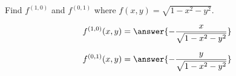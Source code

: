 \documentclass{ximera}
\author{David Guichard \and Neal Koblitz \and H. Jerome Keisler \and Albert Scheller \and Barry Balof \and Mike Wills \and Matthew Carr}
\begin{document}
\begin{exercise}




Find $f^{(1,0)}$ and $f^{(0,1)}$ where $f(x,y)=\sqrt{1-x^2-y^2}$.

\begin{prompt}
\[
f^{(1,0)}(x,y)=\answer{-\frac{x}{\sqrt{1-x^2-y^2}}}
\]
\end{prompt}

\begin{prompt}
\[
f^{(0,1)}(x,y)=\answer{-\frac{y}{\sqrt{1-x^2-y^2}}}
\]
\end{prompt}


\end{exercise}
\end{document}
